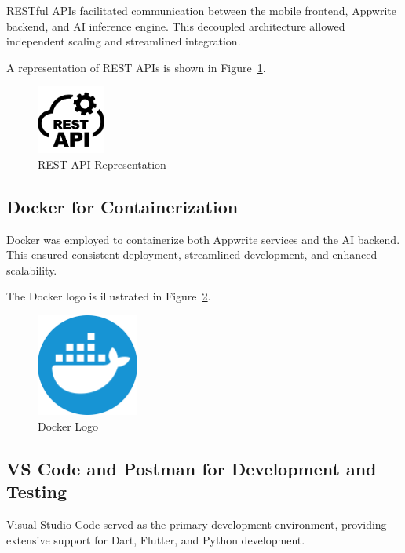 RESTful APIs facilitated communication between the mobile frontend, Appwrite backend, and AI inference engine. This decoupled architecture allowed independent scaling and streamlined integration.

A representation of REST APIs is shown in Figure~\ref{fig:restapi_logo}.

\begin{figure}[H]
    \centering
    \includegraphics[width=0.2\textwidth]{images/tools/restapi.png}
    \caption{REST API Representation}
    \label{fig:restapi_logo}
\end{figure}

\subsection{Docker for Containerization}

Docker was employed to containerize both Appwrite services and the AI backend. This ensured consistent deployment, streamlined development, and enhanced scalability.

The Docker logo is illustrated in Figure~\ref{fig:docker_logo}.

\begin{figure}[H]
    \centering
    \includegraphics[width=0.3\textwidth]{images/tools/docker.png}
    \caption{Docker Logo}
    \label{fig:docker_logo}
\end{figure}

\subsection{VS Code and Postman for Development and Testing}

Visual Studio Code served as the primary development environment, providing extensive support for Dart, Flutter, and Python development.

